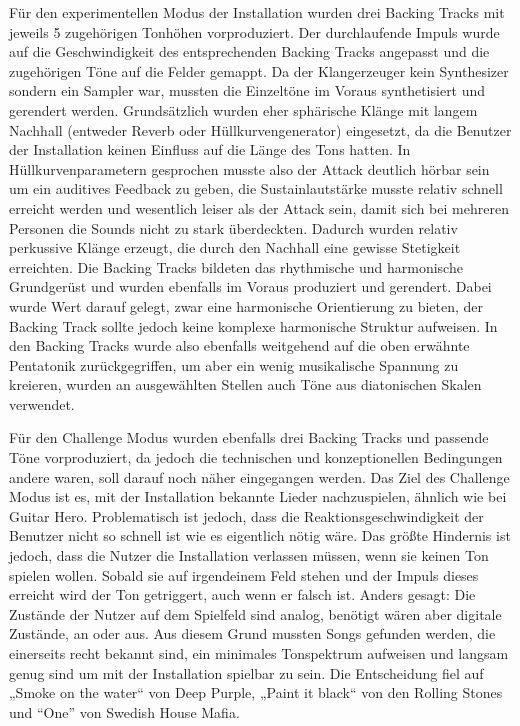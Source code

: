Für den experimentellen Modus der Installation wurden drei Backing Tracks mit jeweils 5 zugehörigen Tonhöhen vorproduziert. Der durchlaufende Impuls wurde auf die Geschwindigkeit des entsprechenden Backing Tracks angepasst und die zugehörigen Töne auf die Felder gemappt. Da der Klangerzeuger kein Synthesizer sondern ein Sampler war, mussten die Einzeltöne im Voraus synthetisiert und gerendert werden. Grundsätzlich wurden eher sphärische Klänge mit langem Nachhall (entweder Reverb oder Hüllkurvengenerator) eingesetzt, da die Benutzer der Installation keinen Einfluss auf die Länge des Tons hatten. In Hüllkurvenparametern gesprochen musste also der Attack deutlich hörbar sein um ein auditives Feedback zu geben, die Sustainlautstärke musste relativ schnell erreicht werden und wesentlich leiser als der Attack sein, damit sich bei mehreren Personen die Sounds nicht zu stark überdeckten. Dadurch wurden relativ perkussive Klänge erzeugt, die durch den Nachhall eine gewisse Stetigkeit erreichten. Die Backing Tracks bildeten das rhythmische und harmonische Grundgerüst und wurden ebenfalls im Voraus produziert und gerendert. Dabei wurde Wert darauf gelegt, zwar eine harmonische Orientierung zu bieten, der Backing Track sollte jedoch keine komplexe harmonische Struktur aufweisen. In den Backing Tracks wurde also ebenfalls weitgehend auf die oben erwähnte Pentatonik zurückgegriffen, um aber ein wenig musikalische Spannung zu kreieren, wurden an ausgewählten Stellen auch Töne aus diatonischen Skalen verwendet.

Für den Challenge Modus wurden ebenfalls drei Backing Tracks und passende Töne vorproduziert, da jedoch die technischen und konzeptionellen Bedingungen andere waren, soll darauf noch näher eingegangen werden. Das Ziel des Challenge Modus ist es, mit der Installation bekannte Lieder nachzuspielen, ähnlich wie bei Guitar Hero. Problematisch ist jedoch, dass die Reaktionsgeschwindigkeit der Benutzer nicht so schnell ist wie es eigentlich nötig wäre. Das größte Hindernis ist jedoch, dass die Nutzer die Installation verlassen müssen, wenn sie keinen Ton spielen wollen. Sobald sie auf irgendeinem Feld stehen und der Impuls dieses erreicht wird der Ton getriggert, auch wenn er falsch ist. Anders gesagt: Die Zustände der Nutzer auf dem Spielfeld sind analog, benötigt wären aber digitale Zustände, an oder aus. Aus diesem Grund mussten Songs gefunden werden, die einerseits recht bekannt sind, ein minimales Tonspektrum aufweisen und langsam genug sind um mit der Installation spielbar zu sein. Die Entscheidung fiel auf „Smoke on the water“ von Deep Purple, „Paint it black“ von den Rolling Stones und “One” von Swedish House Mafia.

